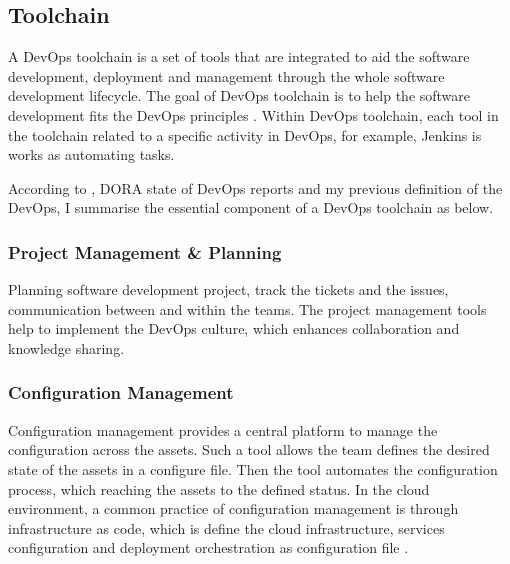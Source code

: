 \subsection{Toolchain}
A DevOps toolchain is a set of tools that are integrated to aid the software development, deployment and management through the whole software development lifecycle. The goal of DevOps toolchain is to help the software development fits the DevOps principles \cite{DevOpsto7:online}\cite{Toolchai10:online}\cite{WhatisaD20:online}. Within DevOps toolchain, each tool in the toolchain related to a specific activity in DevOps, for example, Jenkins is works as automating tasks.
\par
According to \cite{WhatisaD20:online}, DORA state of DevOps reports \cite{forsgrenaccelerate}\cite{velasquez2014state}\cite{forsgren20192019} and my previous definition of the DevOps, I summarise the essential component of a DevOps toolchain as below.
\subsubsection{Project Management \& Planning}
Planning software development project, track the tickets and the issues, communication between and within the teams. The project management tools help to implement the DevOps culture, which enhances collaboration and knowledge sharing.
\subsubsection{Configuration Management}
Configuration management provides a central platform to manage the configuration across the assets. Such a tool allows the team defines the desired state of the assets in a configure file. Then the tool automates the configuration process, which reaching the assets to the defined status. In the cloud environment, a common practice of configuration management is through infrastructure as code, which is define the cloud infrastructure, services configuration and deployment orchestration as configuration file \cite{7965401}.
